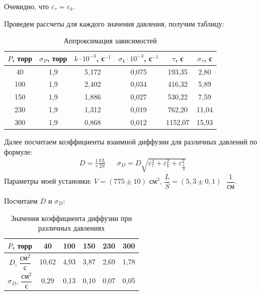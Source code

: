 \documentclass[a4paper,12pt]{article}
\theoremstyle{definition}
\begin{document}
		Очевидно, что $\varepsilon_\tau = \varepsilon_k$.
		
		Проведем рассчеты для каждого значения давления, получим таблицу:
		\bgroup
		\def\arraystretch{1.3}%
		\begin{table}[H]
			\centering
			\begin{tabular}{|c|c|c|c|c|c|}
				\hline
				$ P $, торр & $ \sigma_P $, торр & $ k \cdot 10^{-3} $, с$ ^{-1} $ & $ \sigma_{k} \cdot 10^{-3} $, с$ ^{-1} $ & $ \tau $, с & $ \sigma_\tau $, с \\ \hline
				40 & 1,9 & 5,172 & 0,075 & 193,35 & 2,80 \\ \hline
				100 & 1,9 & 2,402 & 0,034 & 416,32  &5,89  \\ \hline
				150& 1,9 & 1,886 & 0,027 & 530,22 &7,59  \\ \hline
				230 & 1,9 & 1,312 & 0,019 & 762,20  & 11,04 \\ \hline
				300 & 1,9 & 0,868 & 0,012 & 1152,07 & 15,93 \\ \hline
			\end{tabular}
			\caption{Аппроксимация зависимостей}
			\label{tab:approx}
		\end{table}
		\egroup
		
		Далее посчитаем коэффициенты взаимной диффузии для различных давлений по формуле:
		\begin{align}
			D = \frac{1}{\tau}\frac{VL}{2S} & & \sigma_D = D\sqrt{\varepsilon_\tau^2 + \varepsilon_V^2  + \varepsilon_{\frac{L}{S}}^2}
		\end{align}
		Параметры моей установки: $V = (775\pm 10)\text{ см}^3$, $\dfrac{L}{S} = (5,3\pm 0,1)\text{ }\dfrac{1}{\text{см}}$. 
		
		Посчитаем $D\text{ и }\sigma_D$:
		
		\bgroup
		\def\arraystretch{2}%
		\begin{table}[H]
			\centering
			\begin{tabular}{|c||c|c|c|c|c|}
				
				\hline
				$ P $, торр & 40&100&150&230&300\\
				\hline
				$ D $, $\dfrac{\text{см}^2}{\text{с}}$ & 10,62& 4,93& 3,87&2,69&1,78 \\
				\hline
				$ \sigma_D $, $\dfrac{\text{см}^2}{\text{с}}$ & 0,29& 0,13 & 0,10& 0,07&0,05\\
				\hline
			\end{tabular}
			\caption{Значения коэффициента диффузии при различных давлениях}
			\label{tab:D}
		\end{table}
		\egroup
		
\end{document}
